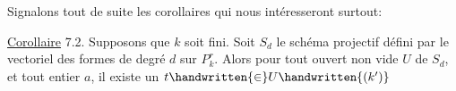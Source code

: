 Signalons tout de suite les corollaires qui nous intéresseront surtout:

\uline{Corollaire} 7.2. Supposons que $k$ soit fini. Soit $S_d$ le schéma projectif défini par le vectoriel des formes de degré $d$ sur $P^r_k$. Alors pour tout ouvert non vide $U$ de $S_d$, et tout entier $a$, il existe un  $t\handwritten{\in}U\handwritten{(k')}$ 
